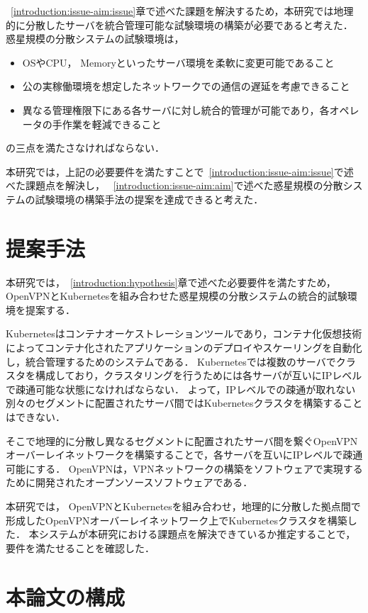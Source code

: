 ~\ref{introduction:issue-aim:issue}章で述べた課題を解決するため，本研究では地理的に分散したサーバを統合管理可能な試験環境の構築が必要であると考えた．
惑星規模の分散システムの試験環境は，
\begin{itemize}
  \item OSやCPU， Memoryといったサーバ環境を柔軟に変更可能であること
  \item 公の実稼働環境を想定したネットワークでの通信の遅延を考慮できること
  \item 異なる管理権限下にある各サーバに対し統合的管理が可能であり，各オペレータの手作業を軽減できること
\end{itemize}
の三点を満たさなければならない．

本研究では，上記の必要要件を満たすことで~\ref{introduction:issue-aim:issue}で述べた課題点を解決し，
~\ref{introduction:issue-aim:aim}で述べた惑星規模の分散システムの試験環境の構築手法の提案を達成できると考えた．

\section{提案手法}
\label{introduction:proposal}

本研究では，~\ref{introduction:hypothesis}章で述べた必要要件を満たすため，OpenVPNとKubernetesを組み合わせた惑星規模の分散システムの統合的試験環境を提案する．

Kubernetesはコンテナオーケストレーションツールであり，コンテナ化仮想技術によってコンテナ化されたアプリケーションのデプロイやスケーリングを自動化し，統合管理するためのシステムである．
Kubernetesでは複数のサーバでクラスタを構成しており，クラスタリングを行うためには各サーバが互いにIPレベルで疎通可能な状態になければならない．
よって，IPレベルでの疎通が取れない別々のセグメントに配置されたサーバ間ではKubernetesクラスタを構築することはできない．

そこで地理的に分散し異なるセグメントに配置されたサーバ間を繋ぐOpenVPNオーバーレイネットワークを構築することで，各サーバを互いにIPレベルで疎通可能にする．
OpenVPNは，VPNネットワークの構築をソフトウェアで実現するために開発されたオープンソースソフトウェアである．

本研究では， OpenVPNとKubernetesを組み合わせ，地理的に分散した拠点間で形成したOpenVPNオーバーレイネットワーク上でKubernetesクラスタを構築した．
本システムが本研究における課題点を解決できているか推定することで，要件を満たせることを確認した．

\section{本論文の構成}
\label{introduction:structure}

